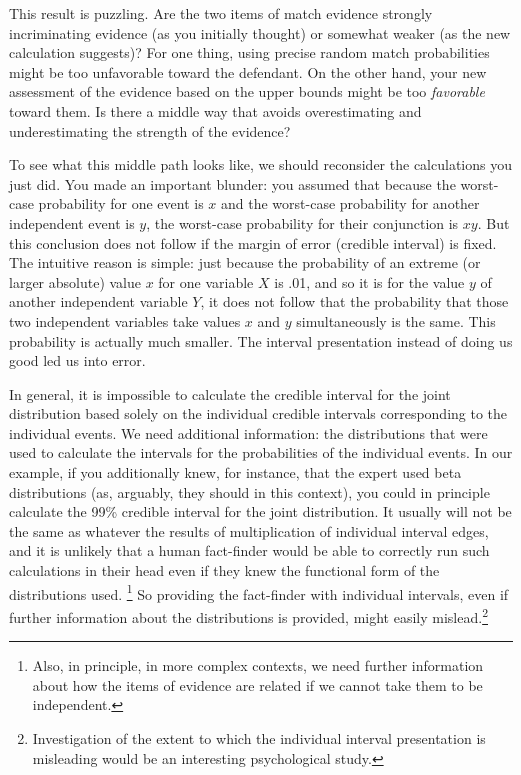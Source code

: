 \documentclass[
  10pt,
  dvipsnames,enabledeprecatedfontcommands]{scrartcl}
\begin{document}
This result is puzzling. Are the two items of match evidence strongly
incriminating evidence (as you initially thought) or somewhat weaker (as
the new calculation suggests)? For one thing, using precise random match
probabilities might be too unfavorable toward the defendant. On the
other hand, your new assessment of the evidence based on the upper
bounds might be too \emph{favorable} toward them. Is there a middle way
that avoids overestimating and underestimating the strength of the
evidence?

To see what this middle path looks like, we should reconsider the
calculations you just did. You made an important blunder: you assumed
that because the worst-case probability for one event is \(x\) and the
worst-case probability for another independent event is \(y\), the
worst-case probability for their conjunction is \(xy\). But this
conclusion does not follow if the margin of error (credible interval) is
fixed. The intuitive reason is simple: just because the probability of
an extreme (or larger absolute) value \(x\) for one variable \(X\) is
.01, and so it is for the value \(y\) of another independent variable
\(Y\), it does not follow that the probability that those two
independent variables take values \(x\) and \(y\) simultaneously is the
same. This probability is actually much smaller. The interval
presentation instead of doing us good led us into error.

In general, it is impossible to calculate the credible interval for the
joint distribution based solely on the individual credible intervals
corresponding to the individual events. We need additional information:
the distributions that were used to calculate the intervals for the
probabilities of the individual events. In our example, if you
additionally knew, for instance, that the expert used beta distributions
(as, arguably, they should in this context), you could in principle
calculate the 99\% credible interval for the joint distribution. It
usually will not be the same as whatever the results of multiplication
of individual interval edges, and it is unlikely that a human
fact-finder would be able to correctly run such calculations in their
head even if they knew the functional form of the distributions used.
\footnote{Also, in principle, in more complex contexts, we need further
  information about how the items of evidence are related if we cannot
  take them to be independent.} So providing the fact-finder with
individual intervals, even if further information about the
distributions is provided, might easily mislead.\footnote{Investigation
  of the extent to which the individual interval presentation is
  misleading would be an interesting psychological study.}
\end{document}
